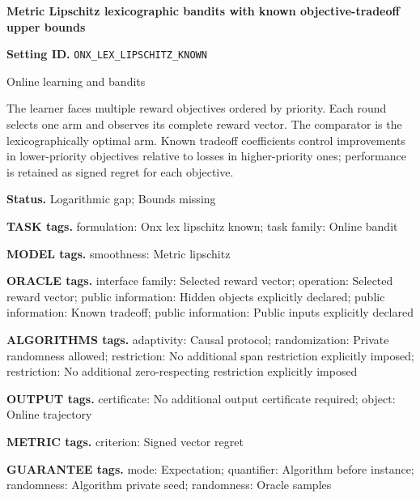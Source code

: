 \documentclass[10pt,a4paper]{article}
\begin{document}
\raggedright

{\LARGE\bfseries\sffamily\color{AtlasNavy} Metric Lipschitz lexicographic bandits with known objective-tradeoff upper bounds\par}\vspace{5pt}


\textbf{Setting ID.} \texttt{ONX\_\allowbreak{}LEX\_\allowbreak{}LIPSCHITZ\_\allowbreak{}KNOWN}



Online learning and bandits



The learner faces multiple reward objectives ordered by priority. Each round selects one arm and observes its complete reward vector. The comparator is the lexicographically optimal arm. Known tradeoff coefficients control improvements in lower-priority objectives relative to losses in higher-priority ones; performance is retained as signed regret for each objective.



\textbf{Status.} Logarithmic gap; Bounds missing



\textbf{TASK tags.} formulation: Onx lex lipschitz known; task family: Online bandit



\textbf{MODEL tags.} smoothness: Metric lipschitz



\textbf{ORACLE tags.} interface family: Selected reward vector; operation: Selected reward vector; public information: Hidden objects explicitly declared; public information: Known tradeoff; public information: Public inputs explicitly declared



\textbf{ALGORITHMS tags.} adaptivity: Causal protocol; randomization: Private randomness allowed; restriction: No additional span restriction explicitly imposed; restriction: No additional zero-respecting restriction explicitly imposed



\textbf{OUTPUT tags.} certificate: No additional output certificate required; object: Online trajectory



\textbf{METRIC tags.} criterion: Signed vector regret



\textbf{GUARANTEE tags.} mode: Expectation; quantifier: Algorithm before instance; randomness: Algorithm private seed; randomness: Oracle samples
\end{document}
